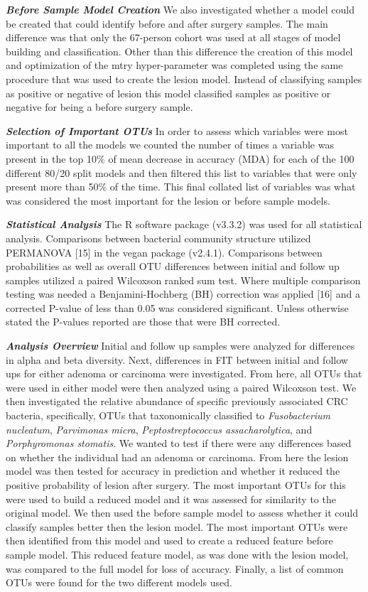 \documentclass[12pt,]{article}
\begin{document}
\textbf{\emph{Before Sample Model Creation}} We also investigated
whether a model could be created that could identify before and after
surgery samples. The main difference was that only the 67-person cohort
was used at all stages of model building and classification. Other than
this difference the creation of this model and optimization of the mtry
hyper-parameter was completed using the same procedure that was used to
create the lesion model. Instead of classifying samples as positive or
negative of lesion this model classified samples as positive or negative
for being a before surgery sample.

\textbf{\emph{Selection of Important OTUs}} In order to assess which
variables were most important to all the models we counted the number of
times a variable was present in the top 10\% of mean decrease in
accuracy (MDA) for each of the 100 different 80/20 split models and then
filtered this list to variables that were only present more than 50\% of
the time. This final collated list of variables was what was considered
the most important for the lesion or before sample models.

\textbf{\emph{Statistical Analysis}} The R software package (v3.3.2) was
used for all statistical analysis. Comparisons between bacterial
community structure utilized PERMANOVA {[}15{]} in the vegan package
(v2.4.1). Comparisons between probabilities as well as overall OTU
differences between initial and follow up samples utilized a paired
Wilcoxson ranked sum test. Where multiple comparison testing was needed
a Benjamini-Hochberg (BH) correction was applied {[}16{]} and a
corrected P-value of less than 0.05 was considered significant. Unless
otherwise stated the P-values reported are those that were BH corrected.

\textbf{\emph{Analysis Overview}} Initial and follow up samples were
analyzed for differences in alpha and beta diversity. Next, differences
in FIT between initial and follow ups for either adenoma or carcinoma
were investigated. From here, all OTUs that were used in either model
were then analyzed using a paired Wilcoxson test. We then investigated
the relative abundance of specific previously associated CRC bacteria,
specifically, OTUs that taxonomically classified to \emph{Fusobacterium
nucleatum}, \emph{Parvimonas micra}, \emph{Peptostreptococcus
assacharolytica}, and \emph{Porphyromonas stomatis}. We wanted to test
if there were any differences based on whether the individual had an
adenoma or carcinoma. From here the lesion model was then tested for
accuracy in prediction and whether it reduced the positive probability
of lesion after surgery. The most important OTUs for this were used to
build a reduced model and it was assessed for similarity to the original
model. We then used the before sample model to assess whether it could
classify samples better then the lesion model. The most important OTUs
were then identified from this model and used to create a reduced
feature before sample model. This reduced feature model, as was done
with the lesion model, was compared to the full model for loss of
accuracy. Finally, a list of common OTUs were found for the two
different models used.
\end{document}
